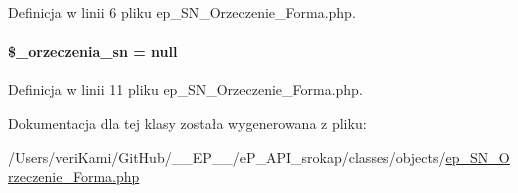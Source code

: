 Definicja w linii 6 pliku ep\-\_\-\-S\-N\-\_\-\-Orzeczenie\-\_\-\-Forma.\-php.

\hypertarget{classep___s_n___orzeczenie___forma_a6f02468de85c0d4fa4f284d88f064662}{
\paragraph[{\$\-\_\-orzeczenia\-\_\-sn}]{\setlength{\rightskip}{0pt plus 5cm}\$\-\_\-orzeczenia\-\_\-sn = null\hspace{0.3cm}{\ttfamily [protected]}}}\label{classep___s_n___orzeczenie___forma_a6f02468de85c0d4fa4f284d88f064662}


Definicja w linii 11 pliku ep\-\_\-\-S\-N\-\_\-\-Orzeczenie\-\_\-\-Forma.\-php.



Dokumentacja dla tej klasy została wygenerowana z pliku\-:\begin{DoxyCompactItemize}
\item 
/\-Users/veri\-Kami/\-Git\-Hub/\-\_\-\-\_\-\-E\-P\-\_\-\-\_\-/e\-P\-\_\-\-A\-P\-I\-\_\-srokap/classes/objects/\hyperlink{ep___s_n___orzeczenie___forma_8php}{ep\-\_\-\-S\-N\-\_\-\-Orzeczenie\-\_\-\-Forma.\-php}\end{DoxyCompactItemize}
